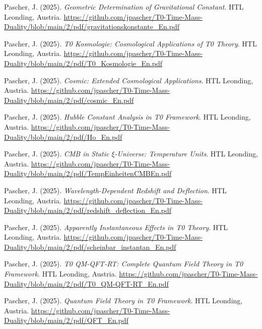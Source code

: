 \documentclass{article}
\begin{document}
\begin{thebibliography}{99}
		Pascher, J. (2025).
		\textit{Geometric Determination of Gravitational Constant}.
		HTL Leonding, Austria.
		\url{https://github.com/jpascher/T0-Time-Mass-Duality/blob/main/2/pdf/gravitationskonstante_En.pdf}
		
		
		Pascher, J. (2025).
		\textit{T0 Kosmologie: Cosmological Applications of T0 Theory}.
		HTL Leonding, Austria.
		\url{https://github.com/jpascher/T0-Time-Mass-Duality/blob/main/2/pdf/T0_Kosmologie_En.pdf}
		
		Pascher, J. (2025).
		\textit{Cosmic: Extended Cosmological Applications}.
		HTL Leonding, Austria.
		\url{https://github.com/jpascher/T0-Time-Mass-Duality/blob/main/2/pdf/cosmic_En.pdf}
		
		Pascher, J. (2025).
		\textit{Hubble Constant Analysis in T0 Framework}.
		HTL Leonding, Austria.
		\url{https://github.com/jpascher/T0-Time-Mass-Duality/blob/main/2/pdf/Ho_En.pdf}
		
		Pascher, J. (2025).
		\textit{CMB in Static $\xi$-Universe: Temperature Units}.
		HTL Leonding, Austria.
		\url{https://github.com/jpascher/T0-Time-Mass-Duality/blob/main/2/pdf/TempEinheitenCMBEn.pdf}
		
		Pascher, J. (2025).
		\textit{Wavelength-Dependent Redshift and Deflection}.
		HTL Leonding, Austria.
		\url{https://github.com/jpascher/T0-Time-Mass-Duality/blob/main/2/pdf/redshift_deflection_En.pdf}
		
		Pascher, J. (2025).
		\textit{Apparently Instantaneous Effects in T0 Theory}.
		HTL Leonding, Austria.
		\url{https://github.com/jpascher/T0-Time-Mass-Duality/blob/main/2/pdf/scheinbar_instantan_En.pdf}
		
		
		Pascher, J. (2025).
		\textit{T0 QM-QFT-RT: Complete Quantum Field Theory in T0 Framework}.
		HTL Leonding, Austria.
		\url{https://github.com/jpascher/T0-Time-Mass-Duality/blob/main/2/pdf/T0_QM-QFT-RT_En.pdf}
		
		Pascher, J. (2025).
		\textit{Quantum Field Theory in T0 Framework}.
		HTL Leonding, Austria.
		\url{https://github.com/jpascher/T0-Time-Mass-Duality/blob/main/2/pdf/QFT_En.pdf}
		

\end{thebibliography}
\end{document}

